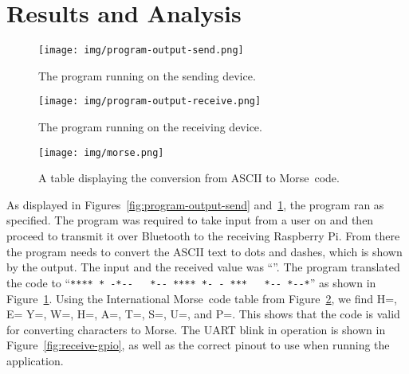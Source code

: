 \documentclass[11pt]{article}
\begin{document}
\section{Results and Analysis}
\label{sec:results_and_analysis}


\begin{figure}[ht]
    \begin{minipage}[t]{0.49\linewidth}
        \centering
        \texttt{[image: img/program-output-send.png]}
        \caption{The program running on the sending device.}
        \label{fig:program-output-send}
    \end{minipage}
    \hspace{\fill}
    \begin{minipage}[t]{0.49\linewidth}
        \centering
        \texttt{[image: img/program-output-receive.png]}
        \caption{The program running on the receiving device.}
        \label{fig:program-output-receive}
    \end{minipage}
\end{figure}


\begin{figure}[ht]
    \centering
    \texttt{[image: img/morse.png]}
    \caption{A table displaying the conversion from ASCII to Morse~code.}
    \label{fig:international_morse_code}
\end{figure}


As displayed in Figures~\ref{fig:program-output-send} and~\ref{fig:program-output-receive}, the program ran as specified.
The program was required to take input from a user on and then proceed to transmit it over Bluetooth to the receiving Raspberry Pi.
From there the program needs to convert the ASCII text to dots and dashes, which is shown by the output.
The input and the received value was ``''.
The program translated the code to ``\verb|**** * -*--   *-- **** *- - ***   *-- *--*|'' as shown in Figure~\ref{fig:program-output-receive}.
Using the International Morse~code table from Figure~\ref{fig:international_morse_code}, we find H=\mcdot{}\mcdot{}\mcdot{}\mcdot{}, E=\mcdot{} Y=\mcdash{}\mcdot{}\mcdash{}\mcdash{}, W=\mcdot{}\mcdash{}\mcdash{}, H=\mcdot{}\mcdot{}\mcdot{}\mcdot{}, A=\mcdot{}\mcdash{}, T=\mcdash{}, S=\mcdot{}\mcdot{}\mcdot{}, U=\mcdot{}\mcdot{}\mcdash{}, and P=\mcdot{}\mcdash{}\mcdash{}\mcdot{}.
This shows that the code is valid for converting characters to Morse.
The UART blink in operation is shown in Figure~\ref{fig:receive-gpio}, as well as the correct pinout to use when running the application.
\end{document}
